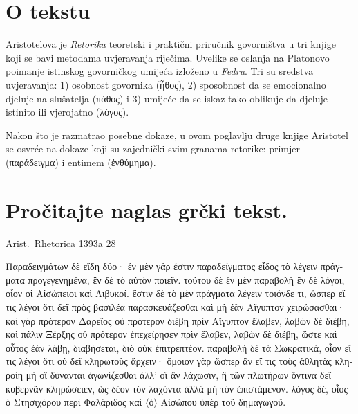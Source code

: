 

\section*{O tekstu}

Aristotelova je \textit{Retorika} teoretski i praktični priručnik govorništva u tri knjige koji se bavi metodama uvjeravanja riječima. Uvelike se oslanja na Platonovo poimanje istinskog govorničkog umijeća izloženo u \textit{Fedru}. Tri su sredstva uvjeravanja: 1) osobnost govornika \textgreek[variant=ancient]{(ἦθος),} 2) sposobnost da se emocionalno djeluje na slušatelja \textgreek[variant=ancient]{(πάθος)} i 3) umijeće da se iskaz tako oblikuje da djeluje istinito ili vjerojatno \textgreek[variant=ancient]{(λόγος).}

Nakon što je razmatrao posebne dokaze, u ovom poglavlju druge knjige Aristotel se osvrće na dokaze koji su zajednički svim granama retorike: primjer \textgreek[variant=ancient]{(παράδειγμα)} i entimem \textgreek[variant=ancient]{(ἐνθύμημα).}

\section*{Pročitajte naglas grčki tekst.}

Arist.\ Rhetorica 1393a 28


\medskip

\begin{greek}
{\large
{ \noindent Παραδειγμάτων δὲ εἴδη δύο· ἓν μὲν γάρ ἐστιν παραδείγματος εἶδος τὸ λέγειν πράγματα προγεγενημένα, ἓν δὲ τὸ αὐτὸν ποιεῖν. τούτου δὲ ἓν μὲν παραβολὴ ἓν δὲ λόγοι, οἷον οἱ Αἰσώπειοι καὶ Λιβυκοί. ἔστιν δὲ τὸ μὲν πράγματα λέγειν τοιόνδε τι, ὥσπερ εἴ τις λέγοι ὅτι δεῖ πρὸς βασιλέα παρασκευάζεσθαι καὶ μὴ ἐᾶν Αἴγυπτον χειρώσασθαι· καὶ γὰρ πρότερον Δαρεῖος οὐ πρότερον διέβη πρὶν Αἴγυπτον ἔλαβεν, λαβὼν δὲ διέβη, καὶ πάλιν Ξέρξης οὐ πρότερον ἐπεχείρησεν πρὶν ἔλαβεν, λαβὼν δὲ διέβη, ὥστε καὶ οὗτος ἐὰν λάβῃ, διαβήσεται, διὸ οὐκ ἐπιτρεπτέον. παραβολὴ δὲ τὰ Σωκρατικά, οἷον εἴ τις λέγοι ὅτι οὐ δεῖ κληρωτοὺς ἄρχειν· ὅμοιον γὰρ ὥσπερ ἂν εἴ τις τοὺς ἀθλητὰς κληροίη μὴ οἳ δύνανται ἀγωνίζεσθαι ἀλλ' οἳ ἂν λάχωσιν, ἢ τῶν πλωτήρων ὅντινα δεῖ κυβερνᾶν κληρώσειεν, ὡς δέον τὸν λαχόντα ἀλλὰ μὴ τὸν ἐπιστάμενον. λόγος δέ, οἷος ὁ Στησιχόρου περὶ Φαλάριδος καὶ $\langle$ὁ$\rangle$ Αἰσώπου ὑπὲρ τοῦ δημαγωγοῦ.

}
}
\end{greek}

